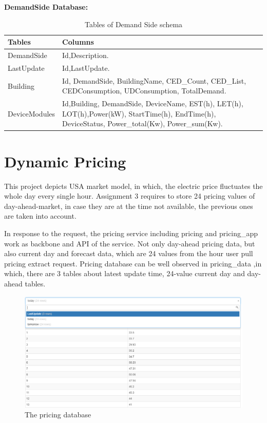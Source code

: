 \documentclass[runningheads]{llncs}
\begin{document}
{\raggedleft \textbf{DemandSide Database:}}
\begin{table}[H]
\centering
\caption{Tables of Demand Side schema}\label{tab2}
\begin{tabular}{|p{2.5cm}|p{9cm}|}
\hline
\textbf{Tables} & \textbf{Columns} \\
\hline 
DemandSide  & Id,Description.\\
\hline
LastUpdate & Id,LastUpdate.\\
\hline 
Building & Id, DemandSide, BuildingName, CED\_Count, CED\_List, CEDConsumption, UDConsumption, TotalDemand.\\
\hline 
DeviceModules  & Id,Building, DemandSide, DeviceName, EST(h), LET(h), LOT(h),Power(kW), StartTime(h), EndTime(h), DeviceStatus, Power\_total(Kw), Power\_sum(Kw).\\
\hline
\end{tabular}
\end{table}
\section{Dynamic Pricing}
This project depicts USA market model, in which, the electric price fluctuates the whole day every single hour. Assignment 3 requires to store 24 pricing values of day-ahead-market, in case they are at the time not available, the previous ones are taken into account.

In response to the request, the pricing service including pricing and pricing\_app work as backbone and API of the service. Not only day-ahead pricing data, but also current day and forecast data, which are 24 values from the hour user pull pricing extract request. Pricing database can be well observed in pricing\_data ,in which, there are 3 tables about latest update time, 24-value current day and day-ahead tables.

\begin{figure}[H]
	\centering
	\includegraphics[width=0.7\columnwidth]{pricingdb.png}
	\caption{The pricing database}
	\label{img:control_database}
\end{figure}
\end{document}
